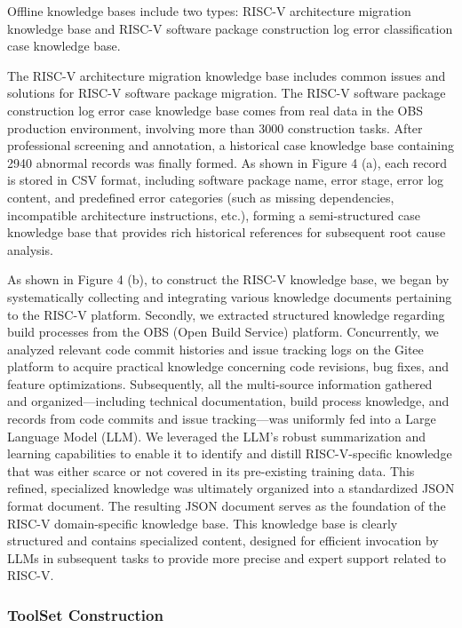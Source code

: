 \documentclass[10pt,conference]{IEEEtran}
\begin{document}
Offline knowledge bases include two types: RISC-V architecture migration knowledge base and RISC-V software package construction log error classification case knowledge base. 

The RISC-V architecture migration knowledge base includes common issues and solutions for RISC-V software package migration. The RISC-V software package construction log error case knowledge base comes from real data in the OBS production environment, involving more than 3000 construction tasks. After professional screening and annotation, a historical case knowledge base containing 2940 abnormal records was finally formed. As shown in Figure 4 (a), each record is stored in CSV format, including software package name, error stage, error log content, and predefined error categories (such as missing dependencies, incompatible architecture instructions, etc.), forming a semi-structured case knowledge base that provides rich historical references for subsequent root cause analysis.

As shown in Figure 4 (b), to construct the RISC-V knowledge base, we began by systematically collecting and integrating various knowledge documents pertaining to the RISC-V platform. Secondly, we extracted structured knowledge regarding build processes from the OBS (Open Build Service) platform. Concurrently, we analyzed relevant code commit histories and issue tracking logs on the Gitee platform to acquire practical knowledge concerning code revisions, bug fixes, and feature optimizations.
Subsequently, all the multi-source information gathered and organized—including technical documentation, build process knowledge, and records from code commits and issue tracking—was uniformly fed into a Large Language Model (LLM). We leveraged the LLM's robust summarization and learning capabilities to enable it to identify and distill RISC-V-specific knowledge that was either scarce or not covered in its pre-existing training data. This refined, specialized knowledge was ultimately organized into a standardized JSON format document.
The resulting JSON document serves as the foundation of the RISC-V domain-specific knowledge base. This knowledge base is clearly structured and contains specialized content, designed for efficient invocation by LLMs in subsequent tasks to provide more precise and expert support related to RISC-V.



\subsubsection{ToolSet Construction}\label{ss:mcts-tools}
\end{document}
